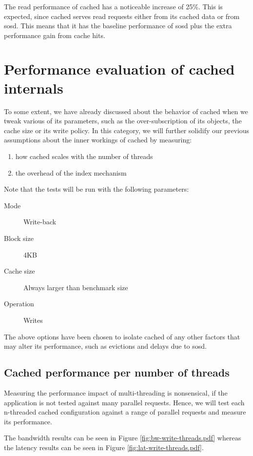The read performance of cached has a noticeable increase of 25\%. This is 
expected, since cached serves read requests either from its cached data or from 
sosd. This means that it has the baseline performance of sosd plus the extra 
performance gain from cache hits.

\section{Performance evaluation of cached internals}\label{sec:internals-plot}

To some extent, we have already discussed about the behavior of cached when we 
tweak various of its parameters, such as the over-subscription of its objects, 
the cache size or its write policy. In this category, we will further solidify 
our previous assumptions about the inner workings of cached by measuring:

\begin{enumerate}
	\item how cached scales with the number of threads
	\item the overhead of the index mechanism
\end{enumerate}

Note that the tests will be run with the following parameters:

\begin{description}
	\item[Mode] Write-back
	\item[Block size] 4KB
	\item[Cache size] Always larger than benchmark size
	\item[Operation] Writes
\end{description}

The above options have been chosen to isolate cached of any other factors that 
may alter its performance, such as evictions and delays due to sosd.

\subsection{Cached performance per number of threads}

Measuring the performance impact of multi-threading is nonsensical, if the 
application is not tested against many parallel requests. Hence, we will test 
each n-threaded cached configuration against a range of parallel requests and 
measure its performance.

The bandwidth results can be seen in Figure \ref{fig:bw-write-threads.pdf} 
whereas the latency results can be seen in Figure 
\ref{fig:lat-write-threads.pdf}.

